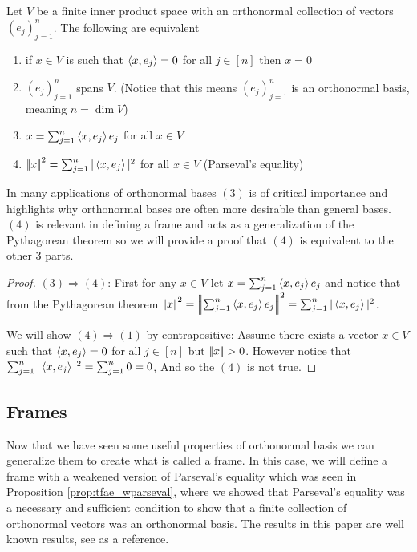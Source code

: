 \begin{prop}
\label{prop:tfae_wparseval}
Let $V$ be a finite inner product space with an orthonormal collection of vectors $(e_j)_{j=1}^n$. The following are equivalent
\begin{enumerate}
    \item if $x\in V$ is such that $\left\langle x,e_j \right\rangle=0$ for all $j\in[n]$ then $x=0$
    \item $(e_j)_{j=1}^n$ spans $V$. (Notice that this means $(e_j)_{j=1}^n$ is an orthonormal basis, meaning $n=\dim V$)
    \item $x=\sum_{j=1}^n\left\langle x,e_j \right\rangle e_j$ for all $x\in V$
    \item $\norm{x}^2=\sum_{j=1}^n|\ip{x,e_j}|^2$ for all $x\in V$ (Parseval's equality)
\end{enumerate}
\end{prop}
In many applications of orthonormal bases $(3)$ is of critical importance and highlights why orthonormal bases are often more desirable than general bases. $(4)$ is relevant in defining a frame and acts as a generalization of the Pythagorean theorem so we will provide a proof that $(4)$ is equivalent to the other 3 parts.
\begin{proof}
    $(3)\Rightarrow (4)$: First for any $x\in V$ let $x=\sum_{j=1}^n\left\langle x,e_j \right\rangle e_j$ and notice that from the Pythagorean theorem $\norm{x}^2=\norm{\sum_{j=1}^n\ip{x,e_j}e_j}^2=\sum_{j=1}^n|\ip{x,e_j}|^2$.

    We will show $(4)\Rightarrow (1)$ by contrapositive: Assume there exists a vector  $x\in V$ such that $\left\langle x,e_j \right\rangle=0$ for all $j\in[n]$ but $\norm{x}> 0$. However notice that $\sum_{j=1}^n|\left\langle x,e_j \right\rangle|^2=\sum_{j=1}^n0=0$, And so the $(4)$ is not true.
\end{proof}

\subsection{Frames}
\label{ssec:frames}
Now that we have seen some useful properties of orthonormal basis we can generalize them to create what is called a frame. In this case, we will define a frame with a weakened version of Parseval's equality which was seen in Proposition \ref{prop:tfae_wparseval}, where we showed that Parseval's equality was a necessary and sufficient condition to show that a finite collection of orthonormal vectors was an orthonormal basis. The results in this paper are well known results, see \cite{king_algebraic_2020} as a reference.

